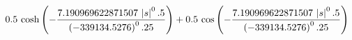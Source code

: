$$0.5\,\cosh \left(-{{7.190969622871507\,\left| s\right| ^0.5}\over{
 \left(-339134.5276\right)^0.25}}\right)+0.5\,\cos \left(-{{
 7.190969622871507\,\left| s\right| ^0.5}\over{\left(-339134.5276
 \right)^0.25}}\right)$$

